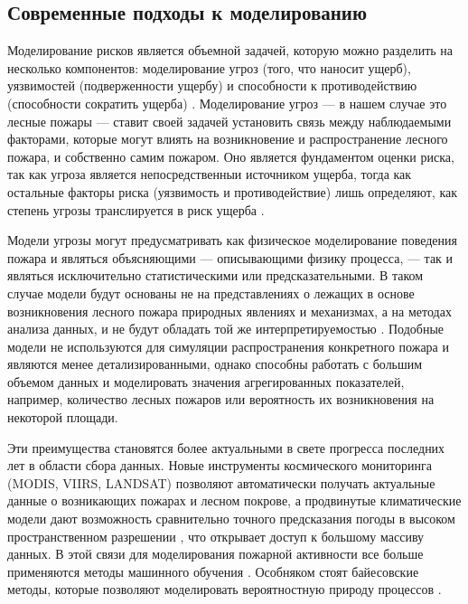 \documentclass[a4paper,article,14pt]{extarticle}
\begin{document}
\subsection{Современные подходы к моделированию}

Моделирование рисков является объемной задачей, которую можно разделить на несколько компонентов: моделирование угроз (того, что наносит ущерб), уязвимостей (подверженности ущербу) и способности к противодействию (способности сократить ущерба) \cite{OliveiraWildfireRiskModeling2021}. Моделирование угроз — в нашем случае это лесные пожары — ставит своей задачей установить связь между наблюдаемыми факторами, которые могут влиять на возникновение и распространение лесного пожара, и собственно самим пожаром. Оно является фундаментом оценки риска, так как угроза является непосредственныи источником ущерба, тогда как остальные факторы риска (уязвимость и противодействие) лишь определяют, как степень угрозы транслируется в риск ущерба \cite{ScottWildfireRiskAssessment2013}. 

Модели угрозы могут предусматривать как физическое моделирование поведения пожара и являться объясняющими — описывающими физику процесса, — так и являться исключительно статистическими или предсказательными. В таком случае модели будут основаны не на представлениях о лежащих в основе возникновения лесного пожара природных явлениях и механизмах, а на методах анализа данных, и не будут обладать той же интерпретируемостью \cite{OliveiraWildfireRiskModeling2021}. Подобные модели не используются для симуляции распространения конкретного пожара и являются менее детализированными, однако способны работать с большим объемом данных и моделировать значения агрегированных показателей, например, количество лесных пожаров или вероятность их возникновения на некоторой площади. 

Эти преимущества становятся более актуальными в свете прогресса последних лет в области сбора данных. Новые инструменты космического мониторинга (MODIS, VIIRS, LANDSAT) позволяют автоматически получать актуальные данные о возникающих пожарах и лесном покрове, а продвинутые климатические модели дают возможность сравнительно точного предсказания погоды в высоком пространственном разрешении \cite{JainReviewMachineLearning2020}, что открывает доступ к большому массиву данных. В этой связи для моделирования пожарной активности все больше применяются методы машинного обучения \cite{OliveiraWildfireRiskModeling2021, JainReviewMachineLearning2020}. Особняком стоят байесовские методы, которые позволяют моделировать вероятностную природу процессов \cite{JainReviewMachineLearning2020}.
\end{document}
